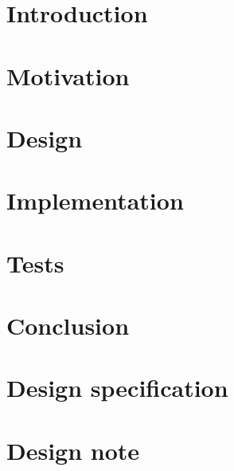 \documentclass[titlepage,12pt,a4paper]{report}
\begin{document}


\tableofcontents
\listoffigures
\printnomenclature
\newpage
{}

\chapter{Introduction}

\chapter{Motivation}

\chapter{Design}

\chapter{Implementation}

\chapter{Tests}

\chapter{Conclusion}


\appendix

\chapter{Design specification}


\chapter{Design note}




\newpage
{}
\printindex
\end{document}
